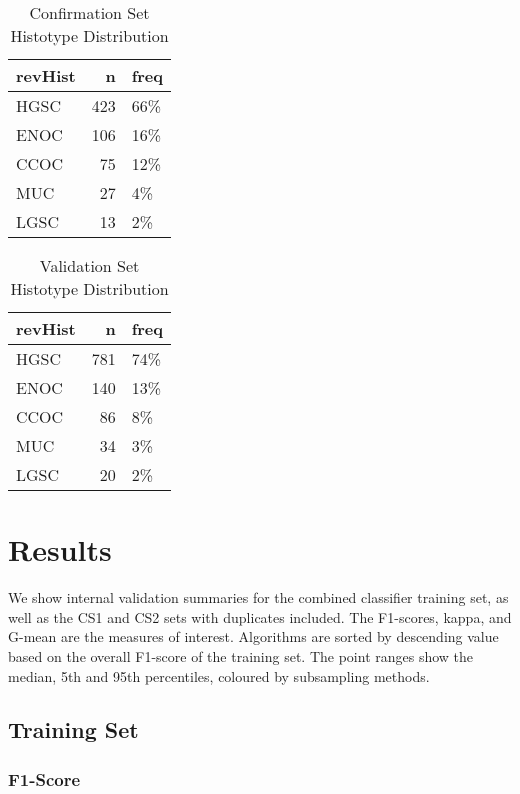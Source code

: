 \documentclass[
]{report}
\begin{document}
\begin{table}

\caption{\label{tab:conf-hist}Confirmation Set Histotype Distribution}
\centering
\begin{tabular}[t]{l|r|l}
\hline
revHist & n & freq\\
\hline
HGSC & 423 & 66\%\\
\hline
ENOC & 106 & 16\%\\
\hline
CCOC & 75 & 12\%\\
\hline
MUC & 27 & 4\%\\
\hline
LGSC & 13 & 2\%\\
\hline
\end{tabular}
\end{table}

\begin{table}

\caption{\label{tab:val-hist}Validation Set Histotype Distribution}
\centering
\begin{tabular}[t]{l|r|l}
\hline
revHist & n & freq\\
\hline
HGSC & 781 & 74\%\\
\hline
ENOC & 140 & 13\%\\
\hline
CCOC & 86 & 8\%\\
\hline
MUC & 34 & 3\%\\
\hline
LGSC & 20 & 2\%\\
\hline
\end{tabular}
\end{table}

\hypertarget{results}{%
\chapter{Results}\label{results}}

We show internal validation summaries for the combined classifier training set, as well as the CS1 and CS2 sets with duplicates included. The F1-scores, kappa, and G-mean are the measures of interest. Algorithms are sorted by descending value based on the overall F1-score of the training set. The point ranges show the median, 5th and 95th percentiles, coloured by subsampling methods.

\hypertarget{training-set}{%
\section{Training Set}\label{training-set}}

\hypertarget{f1-score}{%
\subsection{F1-Score}\label{f1-score}}
\end{document}
